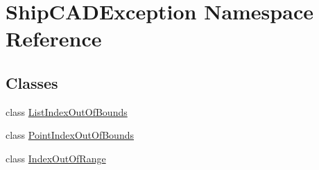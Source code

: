 \hypertarget{namespaceShipCADException}{\section{Ship\-C\-A\-D\-Exception Namespace Reference}
\label{namespaceShipCADException}
}
\subsection*{Classes}
\begin{DoxyCompactItemize}
\item 
class \hyperlink{classShipCADException_1_1ListIndexOutOfBounds}{List\-Index\-Out\-Of\-Bounds}
\item 
class \hyperlink{classShipCADException_1_1PointIndexOutOfBounds}{Point\-Index\-Out\-Of\-Bounds}
\item 
class \hyperlink{classShipCADException_1_1IndexOutOfRange}{Index\-Out\-Of\-Range}
\end{DoxyCompactItemize}
